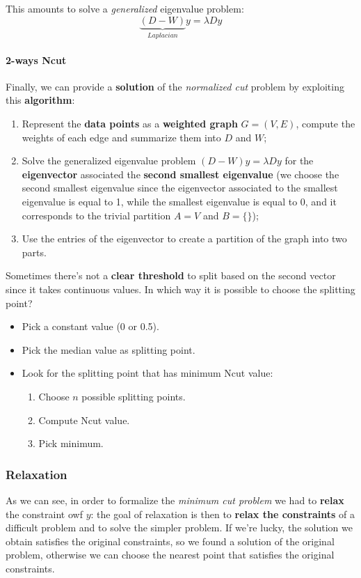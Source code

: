 This amounts to solve a \textit{generalized} eigenvalue problem:
$$
\underbrace{(D-W)}_{Laplacian}y=\lambda D y
$$

\paragraph{2-ways Ncut} Finally, we can provide a \textbf{solution} of the \textit{normalized cut} problem by exploiting this \textbf{algorithm}:

\begin{enumerate}
	\item Represent the \textbf{data points} as a \textbf{weighted graph} $G = (V,E)$, compute the weights of each edge and summarize them into $D$ and $W$;
	\item Solve the generalized eigenvalue problem $(D-W)y = \lambda Dy$ for the \textbf{eigenvector} associated the \textbf{second smallest eigenvalue} (we choose the second smallest eigenvalue since the eigenvector associated to the smallest eigenvalue is equal to 1, while the smallest eigenvalue is equal to 0, and it corresponds to the trivial partition $A = V$ and $B = \{\}$);
	\item Use the entries of the eigenvector to create a partition of the graph into two parts.
\end{enumerate}

Sometimes there's not a \textbf{clear threshold} to split based on the second vector since it takes continuous values. In which way it is possible to choose the splitting point?
\begin{itemize}
	\item Pick a constant value (0 or 0.5).
	\item Pick the median value as splitting point.
	\item Look for the splitting point that has minimum Ncut value:
	\begin{enumerate}
		\item Choose $n$ possible splitting points.
		\item Compute Ncut value.
		\item Pick minimum.
	\end{enumerate}
\end{itemize}

\subsubsection{Relaxation}
As we can see, in order to formalize the \textit{minimum cut problem} we had to \textbf{relax} the constraint owf $y$: the goal of relaxation is then to \textbf{relax the constraints} of a difficult problem and to solve the simpler problem. If we're lucky, the solution we obtain satisfies the original constraints, so we found a solution of the original problem, otherwise we can choose the nearest point that satisfies the original constraints.

